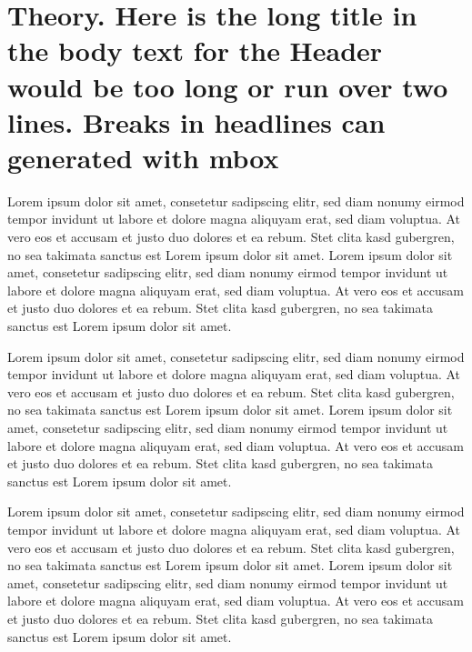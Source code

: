 \chapter[Theory (here is the short title in the table of contents and in the header)]{Theory. Here is the long title in the body text for the Header would be too long or run over two lines. Breaks in headlines can generated with mbox}
\label{cha:Theory}


Lorem ipsum dolor sit amet, consetetur sadipscing elitr, sed diam nonumy eirmod tempor invidunt ut labore et dolore magna aliquyam erat, sed diam voluptua. At vero eos et accusam et justo duo dolores et ea rebum. Stet clita kasd gubergren, no sea takimata sanctus est Lorem ipsum dolor sit amet. Lorem ipsum dolor sit amet, consetetur sadipscing elitr, sed diam nonumy eirmod tempor invidunt ut labore et dolore magna aliquyam erat, sed diam voluptua. At vero eos et accusam et justo duo dolores et ea rebum. Stet clita kasd gubergren, no sea takimata sanctus est Lorem ipsum dolor sit amet.

Lorem ipsum dolor sit amet, consetetur sadipscing elitr, sed diam nonumy eirmod tempor invidunt ut labore et dolore magna aliquyam erat, sed diam voluptua. At vero eos et accusam et justo duo dolores et ea rebum. Stet clita kasd gubergren, no sea takimata sanctus est Lorem ipsum dolor sit amet. Lorem ipsum dolor sit amet, consetetur sadipscing elitr, sed diam nonumy eirmod tempor invidunt ut labore et dolore magna aliquyam erat, sed diam voluptua. At vero eos et accusam et justo duo dolores et ea rebum. Stet clita kasd gubergren, no sea takimata sanctus est Lorem ipsum dolor sit amet.

Lorem ipsum dolor sit amet, consetetur sadipscing elitr, sed diam nonumy eirmod tempor invidunt ut labore et dolore magna aliquyam erat, sed diam voluptua. At vero eos et accusam et justo duo dolores et ea rebum. Stet clita kasd gubergren, no sea takimata sanctus est Lorem ipsum dolor sit amet. Lorem ipsum dolor sit amet, consetetur sadipscing elitr, sed diam nonumy eirmod tempor invidunt ut labore et dolore magna aliquyam erat, sed diam voluptua. At vero eos et accusam et justo duo dolores et ea rebum. Stet clita kasd gubergren, no sea takimata sanctus est Lorem ipsum dolor sit amet.

